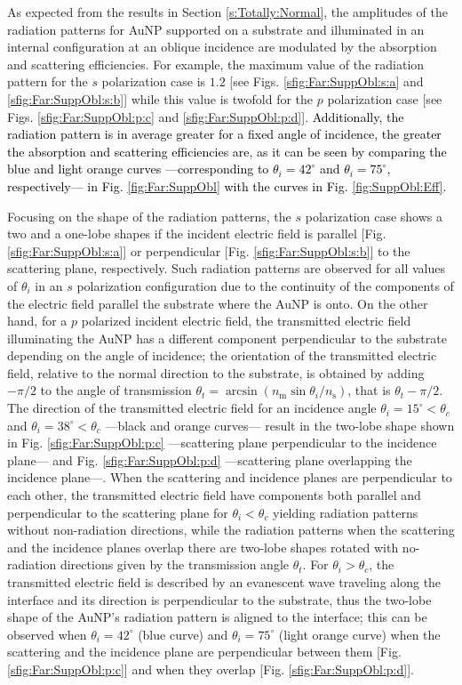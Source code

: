 As expected from the results in Section \ref{s:Totally:Normal}, the amplitudes of the radiation patterns for AuNP supported on a substrate and illuminated in an internal configuration at an oblique incidence are modulated by the absorption and scattering efficiencies. For example, the maximum value of the radiation pattern for the $s$ polarization case is $1.2$ [see Figs. \ref{sfig:Far:SuppObl:s:a} and \ref{sfig:Far:SuppObl:s:b}] while this value is twofold for the $p$ polarization case [see Figs. \ref{sfig:Far:SuppObl:p:c} and \ref{sfig:Far:SuppObl:p:d}]. \textcolor{black}{Additionally, the radiation pattern is in average greater for a fixed angle of incidence, the greater the absorption and scattering efficiencies are, as it can be seen by comparing the blue and light orange curves ---corresponding to $\theta_i = 42^\circ$ and $\theta_i = 75^\circ$, respectively--- in Fig. \ref{fig:Far:SuppObl} with the curves in Fig. \ref{fig:SuppObl:Eff}.}

Focusing on the shape of the radiation patterns, the $s$ polarization case shows a two and a one-lobe shapes if the incident electric field is parallel [Fig. \ref{sfig:Far:SuppObl:s:a}] or perpendicular [Fig. \ref{sfig:Far:SuppObl:s:b}] to the scattering plane, respectively. Such radiation patterns are observed for all values of $\theta_i$ in an $s$ polarization configuration due to the continuity of the components of the electric field parallel the substrate where the AuNP is onto. On the other hand, for a $p$ polarized incident electric field, the transmitted electric field illuminating the AuNP has a different component perpendicular to the substrate depending on the angle of incidence; the orientation of the transmitted electric field, relative to the normal direction to the substrate, is obtained by adding $-\pi/2$ to the angle of transmission $\theta_t = \arcsin(n_\text{m}\sin\theta_i/n_\text{s})$, that is $\theta_t - \pi/2$. The direction of the transmitted electric field for an incidence angle $\theta_i = 15^\circ<\theta_c$ and $\theta_i = 38^\circ<\theta_c$ ---black and orange curves--- result in the two-lobe shape shown in Fig. \ref{sfig:Far:SuppObl:p:c} ---scattering plane perpendicular to the incidence plane--- and Fig. \ref{sfig:Far:SuppObl:p:d} ---scattering plane overlapping the incidence plane---. When the scattering and incidence planes are perpendicular to each other, the transmitted electric field have components both parallel and perpendicular to the scattering plane for $\theta_i<\theta_c$ yielding radiation patterns without non-radiation directions, while the radiation patterns when the scattering and the incidence planes overlap there are two-lobe shapes rotated with no-radiation directions given by the transmission angle $\theta_t$. For $\theta_i>\theta_c$, the transmitted electric field is described by an evanescent wave traveling along the interface and its direction is perpendicular to the substrate, thus the two-lobe shape of the AuNP's radiation pattern is aligned to the interface; this can be observed when $\theta_i = 42^\circ$ (blue curve) and $\theta_i = 75^\circ$ (light orange curve) when the scattering and the incidence plane are perpendicular between them [Fig. \ref{sfig:Far:SuppObl:p:c}] and when they overlap [Fig. \ref{sfig:Far:SuppObl:p:d}].

